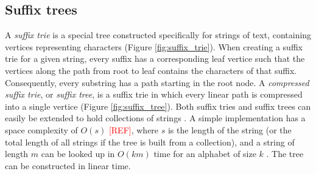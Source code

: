 \documentclass[thesis.tex]{subfiles}
\begin{document}
\subsection{Suffix trees}
A \textit{suffix trie} is a special tree constructed specifically for strings of text, containing vertices representing characters (Figure \ref{fig:suffix_trie}). When creating a suffix trie for a given string, every suffix has a corresponding leaf vertice such that the vertices along the path from root to leaf contains the characters of that suffix. Consequently, every substring has a path starting in the root node. A \textit{compressed suffix trie}, or \textit{suffix tree}, is a suffix trie in which every linear path is compressed into a single vertice (Figure \ref{fig:suffix_tree}). Both suffix tries and suffix trees can easily be extended to hold collections of strings \cite[Chapter 20]{algorithms_sequential_parallell_and_distributed}. A simple implementation has a space complexity of $O(s)$ \textcolor{red}{[REF]}, where $s$ is the length of the string (or the total length of all strings if the tree is built from a collection), and a string of length $m$ can be looked up in $O(km)$ time for an alphabet of size $k$ \cite[Section 20.6.1]{algorithms_sequential_parallell_and_distributed}. The tree can be constructed in linear time\cite{online_construction_of_suffix_trees}.
\clearpage\noindent
\end{document}
